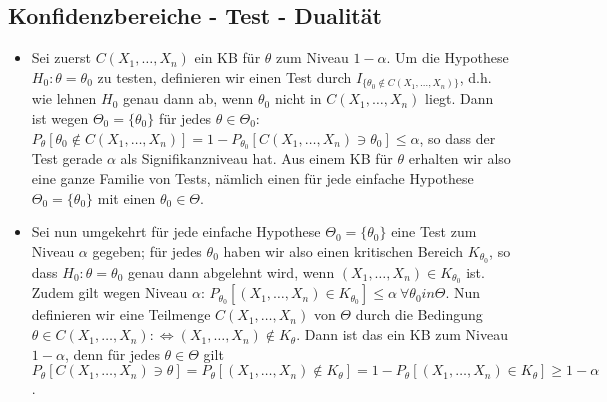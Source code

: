 \subsection{Konfidenzbereiche - Test - Dualität}
\begin{itemize}
    \item Sei zuerst $C(X_1, \dots, X_n)$ ein KB für $\theta$ zum Niveau $1 - \alpha$. Um die Hypothese $H_0 : \theta = \theta_0$ zu testen, definieren wir einen Test durch $I_{\{\theta_0 \notin C(X_1, \dots, X_n)\} }$, d.h. wie lehnen $H_0$ genau dann ab, wenn $\theta_0$ nicht in $C(X_1, \dots, X_n)$ liegt. Dann ist wegen $\Theta_0 = \{\theta_0\}$ für jedes $\theta \in \Theta_0$:\\
    $P_\theta[\theta_0 \notin C(X_1, \dots, X_n)] = 1 - P_{\theta_0}[C(X_1, \dots, X_n) \ni \theta_0] \le \alpha$, so dass der Test gerade $\alpha$ als Signifikanzniveau hat. Aus einem KB für $\theta$ erhalten wir also eine ganze Familie von Tests, nämlich einen für jede einfache Hypothese $\Theta_0 = \{\theta_0\}$ mit einen $\theta_0 \in \Theta$.
\item Sei nun umgekehrt für jede einfache Hypothese $\Theta_0 = \{\theta_0\} $ eine Test zum Niveau $\alpha$ gegeben; für jedes $\theta_0$ haben wir also einen kritischen Bereich $K_{\theta_0}$, so dass $H_0: \theta = \theta_0$ genau dann abgelehnt wird, wenn $(X_1, \dots, X_n) \in K_{\theta_0}$ ist. Zudem gilt wegen Niveau $\alpha$: $P_{\theta_0}[(X_1, \dots, X_n) \in K_{\theta_0}] \le \alpha \ \forall \theta_0 in \Theta$. Nun definieren wir eine Teilmenge $C(X_1, \dots, X_n)$ von $\Theta$ durch die Bedingung\\
    $\theta \in C(X_1, \dots, X_n) :\iff (X_1, \dots, X_n) \notin K_\theta$. Dann ist das ein KB zum Niveau $1 - \alpha$, denn für jedes $\theta \in \Theta$ gilt\\
    $P_\theta[C(X_1, \dots, X_n) \ni \theta] = P_\theta[(X_1, \dots, X_n) \notin K_\theta] = 1 - P_\theta[(X_1, \dots, X_n) \in K_\theta] \ge 1 - \alpha$.
\end{itemize}
